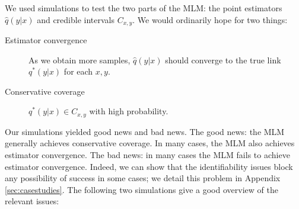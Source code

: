 We used simulations to test the two parts of the MLM: the point estimators $\hat q(y|x)$ and credible intervals $C_{x,y}$.  We would ordinarily hope for two things:
\begin{description}
    \item[Estimator convergence] As we obtain more samples, $\hat q(y|x)$ should converge to the true link $q^*(y|x)$ for each $x,y$.
    \item[Conservative coverage] $q^*(y|x) \in C_{x,y}$ with high probability.
\end{description}
Our simulations yielded good news and bad news.  The good news: the MLM generally achieves conservative coverage.  In many cases, the MLM also achieves estimator convergence.  The bad news: in many cases the MLM fails to achieve estimator convergence.  Indeed, we can show that the identifiability issues block any possibility of success in some cases; we detail this problem in Appendix \ref{sec:casestudies}.  The following two simulations give a good overview of the relevant issues:

